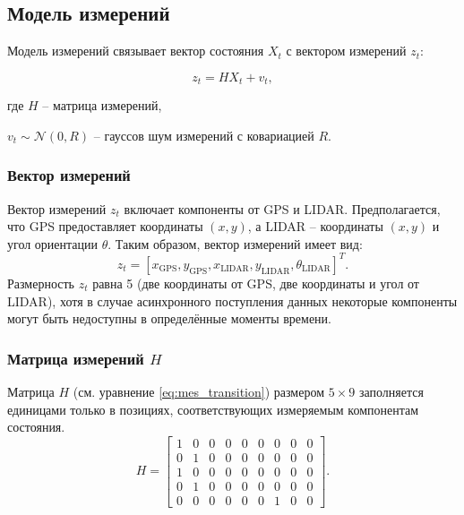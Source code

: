 \subsection{Модель измерений}
\label{sec:measurement_model}

Модель измерений связывает вектор состояния \({X}_t\) с вектором измерений \({z}_t\):

\begin{equation}
{z}_t = {H} {X}_t + {v}_t,
\label{eq:measurement_model}
\end{equation}

\begin{explanationx}
	\item[где] \({H}\) -- матрица измерений,
	\item \({v}_t \sim \mathcal{N}(0, {R})\) -- гауссов шум измерений с ковариацией \({R}\).
\end{explanationx}

\subsubsection{Вектор измерений}
\label{subsec:measurement_vector}

Вектор измерений \({z}_t\) включает компоненты от GPS и LIDAR. Предполагается, что GPS предоставляет координаты \((x, y)\), а LIDAR -- координаты \((x, y)\) и угол ориентации \(\theta\). Таким образом, вектор измерений имеет вид:
\[
{z}_t = [x_{\text{GPS}}, y_{\text{GPS}}, x_{\text{LIDAR}}, y_{\text{LIDAR}}, \theta_{\text{LIDAR}}]^T.
\]
Размерность \({z}_t\) равна 5 (две координаты от GPS, две координаты и угол от LIDAR), 
хотя в случае асинхронного поступления данных некоторые компоненты могут быть недоступны в определённые моменты времени.

\subsubsection{Матрица измерений \({H}\)}
\label{subsec:measurement_matrix}

Матрица \({H}\) (см. уравнение \ref{eq:mes_transition}) размером \(5 \times 9\)
заполняется единицами только в позициях, соответствующих измеряемым компонентам состояния.
\begin{equation}
	\label{eq:mes_transition}
	{H} =
	\begin{bmatrix}
	1 & 0 & 0 & 0 & 0 & 0 & 0 & 0 & 0 \\
	0 & 1 & 0 & 0 & 0 & 0 & 0 & 0 & 0 \\
	1 & 0 & 0 & 0 & 0 & 0 & 0 & 0 & 0 \\
	0 & 1 & 0 & 0 & 0 & 0 & 0 & 0 & 0 \\
	0 & 0 & 0 & 0 & 0 & 0 & 1 & 0 & 0
	\end{bmatrix}.
\end{equation}

